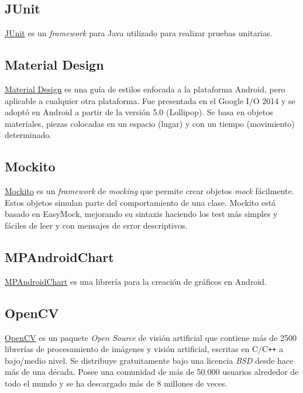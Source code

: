 \subsection{JUnit}\label{junit}

\href{http://junit.org/junit4/}{JUnit} es un \emph{framework} para Java
utilizado para realizar pruebas unitarias.

\subsection{Material Design}\label{material-design}

\href{https://material.io/guidelines/}{Material Design} es una guía de
estilos enfocada a la plataforma Android, pero aplicable a cualquier
otra plataforma. Fue presentada en el Google I/O 2014 y se adoptó en
Android a partir de la versión 5.0 (Lollipop). Se basa en objetos
materiales, piezas colocadas en un espacio (lugar) y con un tiempo
(movimiento) determinado.

\subsection{Mockito}\label{mockito}

\href{http://mockito.org/}{Mockito} es un \emph{framework} de
\emph{mocking} que permite crear objetos \emph{mock} fácilmente. Estos
objetos simulan parte del comportamiento de una clase. Mockito está
basado en EasyMock, mejorando su sintaxis haciendo los test más simples
y fáciles de leer y con mensajes de error descriptivos.

\subsection{MPAndroidChart}\label{mpandroidchart}

\href{https://github.com/PhilJay/MPAndroidChart}{MPAndroidChart} es una
librería para la creación de gráficos en Android.

\subsection{OpenCV}\label{opencv}

\href{www.opencv.org}{OpenCV} es un paquete \emph{Open Source} de visión
artificial que contiene más de 2500 librerías de procesamiento de
imágenes y visión artificial, escritas en C/C\texttt{++} a bajo/medio nivel. Se
distribuye gratuitamente bajo una licencia \emph{BSD} desde hace más de
una década. Posee una comunidad de más de 50.000 usuarios alrededor de
todo el mundo y se ha descargado más de 8 millones de veces.

